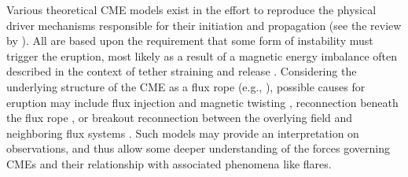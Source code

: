 \documentclass[namedreferences]{solarphysics}
\begin{document}
\begin{article}
Various theoretical CME models exist in the effort to reproduce the physical driver mechanisms responsible for their initiation and propagation (see the review by ). All are based upon the requirement that some form of instability must trigger the eruption, most likely as a result of a magnetic energy imbalance often described in the context of tether straining and release \cite{2001AGUGM.125..143K}. Considering the underlying structure of the CME as a flux rope (e.g., ), possible causes for eruption may include flux injection and magnetic twisting \cite{2006PhRvL..96y5002K,2001ApJ...562.1045K}, reconnection beneath the flux rope \cite{2007ApJ...658L.123L,2003ApJ...595.1231A}, or breakout reconnection between the overlying field and neighboring flux systems \cite{2008ApJ...683.1192L,2007ApJ...671L..77V}. Such models may provide an interpretation on observations, and thus allow some deeper understanding of the forces governing CMEs and their relationship with associated phenomena like flares.




\end{article}
\end{document}
